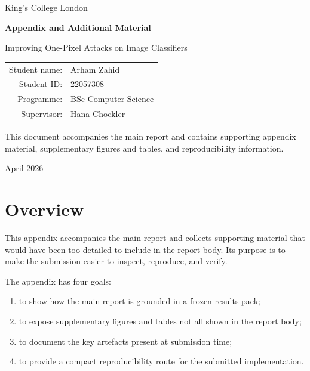 \documentclass[11pt,a4paper]{report}
\begin{document}
\begin{titlepage}
  \centering
  {\Large King's College London\par}
  \vspace{1.5cm}
  {\Huge \textbf{Appendix and Additional Material}\par}
  \vspace{0.5cm}
  {\Large Improving One-Pixel Attacks on Image Classifiers\par}
  \vspace{1.5cm}

  \begin{tabular}{rl}
    Student name: & Arham Zahid \\
    Student ID: & 22057308 \\
    Programme: & BSc Computer Science \\
    Supervisor: & Hana Chockler \\
  \end{tabular}

  \vfill

  {\large This document accompanies the main report and contains supporting appendix material, supplementary figures and tables, and reproducibility information.\par}

  \vfill
  {\large April 2026\par}
\end{titlepage}

\tableofcontents
\clearpage
{}
\hypersetup{pageanchor=true}

\appendix

\chapter{Overview}

This appendix accompanies the main report and collects supporting material that would have been
too detailed to include in the report body. Its purpose is to make the submission easier to
inspect, reproduce, and verify.

The appendix has four goals:
\begin{enumerate}
  \item to show how the main report is grounded in a frozen results pack;
  \item to expose supplementary figures and tables not all shown in the report body;
  \item to document the key artefacts present at submission time;
  \item to provide a compact reproducibility route for the submitted implementation.
\end{enumerate}
\end{document}

